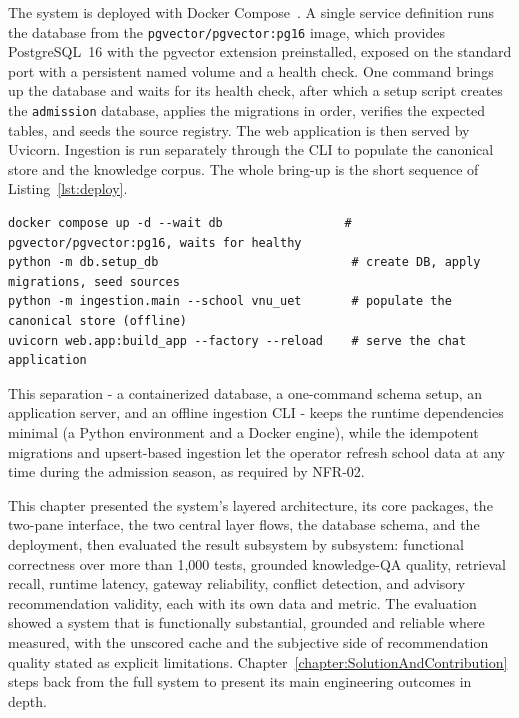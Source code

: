 \documentclass[../main.tex]{subfiles}
\begin{document}
The system is deployed with Docker Compose~\cite{docker}.
A single service definition runs the database from the \texttt{pgvector/pgvector:pg16} image, which provides PostgreSQL~16 with the pgvector extension preinstalled, exposed on the standard port with a persistent named volume and a health check.
One command brings up the database and waits for its health check, after which a setup script creates the \texttt{admission} database, applies the migrations in order, verifies the expected tables, and seeds the source registry.
The web application is then served by Uvicorn.
Ingestion is run separately through the \gls{CLI} to populate the canonical store and the knowledge corpus.
The whole bring-up is the short sequence of Listing~\ref{lst:deploy}.

\begin{lstlisting}[language={},caption={One-command database bring-up, schema setup, and application server (from \texttt{QUICKSTART.md})},label=lst:deploy,basicstyle=\footnotesize\ttfamily,breaklines=true,breakatwhitespace=false,columns=fullflexible,showstringspaces=false]
docker compose up -d --wait db                 # pgvector/pgvector:pg16, waits for healthy
python -m db.setup_db                           # create DB, apply migrations, seed sources
python -m ingestion.main --school vnu_uet       # populate the canonical store (offline)
uvicorn web.app:build_app --factory --reload    # serve the chat application
\end{lstlisting}

This separation - a containerized database, a one-command schema setup, an application server, and an offline ingestion \gls{CLI} - keeps the runtime dependencies minimal (a Python environment and a Docker engine), while the idempotent migrations and upsert-based ingestion let the operator refresh school data at any time during the admission season, as required by NFR-02.

This chapter presented the system's layered architecture, its core packages, the two-pane interface, the two central layer flows, the database schema, and the deployment, then evaluated the result subsystem by subsystem: functional correctness over more than 1{,}000 tests, grounded knowledge-QA quality, retrieval recall, runtime latency, gateway reliability, conflict detection, and advisory recommendation validity, each with its own data and metric.
The evaluation showed a system that is functionally substantial, grounded and reliable where measured, with the unscored cache and the subjective side of recommendation quality stated as explicit limitations.
Chapter~\ref{chapter:SolutionAndContribution} steps back from the full system to present its main engineering outcomes in depth.
\end{document}
